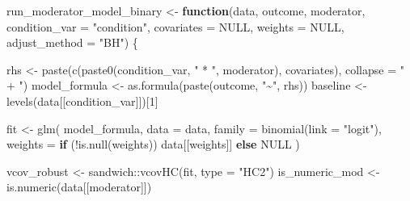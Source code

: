\documentclass[
  letterpaper,
  DIV=11,
  numbers=noendperiod]{scrartcl}
\newenvironment{Shaded}{\begin{snugshade}}{\end{snugshade}}
\newcommand{\AttributeTok}[1]{\textcolor[rgb]{0.40,0.45,0.13}{#1}}
\newcommand{\ConstantTok}[1]{\textcolor[rgb]{0.56,0.35,0.01}{#1}}
\newcommand{\ControlFlowTok}[1]{\textcolor[rgb]{0.00,0.23,0.31}{\textbf{#1}}}
\newcommand{\DecValTok}[1]{\textcolor[rgb]{0.68,0.00,0.00}{#1}}
\newcommand{\FunctionTok}[1]{\textcolor[rgb]{0.28,0.35,0.67}{#1}}
\newcommand{\NormalTok}[1]{\textcolor[rgb]{0.00,0.23,0.31}{#1}}
\newcommand{\OtherTok}[1]{\textcolor[rgb]{0.00,0.23,0.31}{#1}}
\newcommand{\SpecialCharTok}[1]{\textcolor[rgb]{0.37,0.37,0.37}{#1}}
\newcommand{\StringTok}[1]{\textcolor[rgb]{0.13,0.47,0.30}{#1}}
\begin{document}
\begin{Shaded}
\begin{Highlighting}[]
\NormalTok{run\_moderator\_model\_binary }\OtherTok{\textless{}{-}} \ControlFlowTok{function}\NormalTok{(data,}
\NormalTok{                                       outcome,}
\NormalTok{                                       moderator,}
                                       \AttributeTok{condition\_var =} \StringTok{"condition"}\NormalTok{,}
                                       \AttributeTok{covariates    =} \ConstantTok{NULL}\NormalTok{,}
                                       \AttributeTok{weights       =} \ConstantTok{NULL}\NormalTok{,}
                                       \AttributeTok{adjust\_method =} \StringTok{"BH"}\NormalTok{) \{}
  
\NormalTok{  rhs           }\OtherTok{\textless{}{-}} \FunctionTok{paste}\NormalTok{(}\FunctionTok{c}\NormalTok{(}\FunctionTok{paste0}\NormalTok{(condition\_var, }\StringTok{" * "}\NormalTok{, moderator), covariates),}
                         \AttributeTok{collapse =} \StringTok{" + "}\NormalTok{)}
\NormalTok{  model\_formula }\OtherTok{\textless{}{-}} \FunctionTok{as.formula}\NormalTok{(}\FunctionTok{paste}\NormalTok{(outcome, }\StringTok{"\textasciitilde{}"}\NormalTok{, rhs))}
\NormalTok{  baseline      }\OtherTok{\textless{}{-}} \FunctionTok{levels}\NormalTok{(data[[condition\_var]])[}\DecValTok{1}\NormalTok{]}
  
\NormalTok{  fit }\OtherTok{\textless{}{-}} \FunctionTok{glm}\NormalTok{(}
\NormalTok{    model\_formula,}
    \AttributeTok{data    =}\NormalTok{ data,}
    \AttributeTok{family  =} \FunctionTok{binomial}\NormalTok{(}\AttributeTok{link =} \StringTok{"logit"}\NormalTok{),}
    \AttributeTok{weights =} \ControlFlowTok{if}\NormalTok{ (}\SpecialCharTok{!}\FunctionTok{is.null}\NormalTok{(weights)) data[[weights]] }\ControlFlowTok{else} \ConstantTok{NULL}
\NormalTok{  )}
  
\NormalTok{  vcov\_robust    }\OtherTok{\textless{}{-}}\NormalTok{ sandwich}\SpecialCharTok{::}\FunctionTok{vcovHC}\NormalTok{(fit, }\AttributeTok{type =} \StringTok{"HC2"}\NormalTok{)}
\NormalTok{  is\_numeric\_mod }\OtherTok{\textless{}{-}} \FunctionTok{is.numeric}\NormalTok{(data[[moderator]])}
  

\end{Highlighting}
\end{Shaded}
\end{document}
